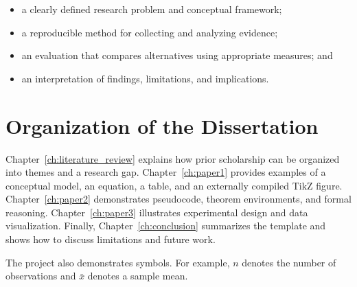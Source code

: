 \begin{itemize}
    \item a clearly defined research problem and conceptual framework;
    \item a reproducible method for collecting and analyzing evidence;
    \item an evaluation that compares alternatives using appropriate measures; and
    \item an interpretation of findings, limitations, and implications.
\end{itemize}

\section{Organization of the Dissertation}

Chapter~\ref{ch:literature_review} explains how prior scholarship can be organized into themes and a research gap. Chapter~\ref{ch:paper1} provides examples of a conceptual model, an equation, a table, and an externally compiled TikZ figure. Chapter~\ref{ch:paper2} demonstrates pseudocode, theorem environments, and formal reasoning. Chapter~\ref{ch:paper3} illustrates experimental design and data visualization. Finally, Chapter~\ref{ch:conclusion} summarizes the template and shows how to discuss limitations and future work.

The project also demonstrates symbols. For example, \(n\) denotes the number of observations and \(\bar{x}\) denotes a sample mean.
